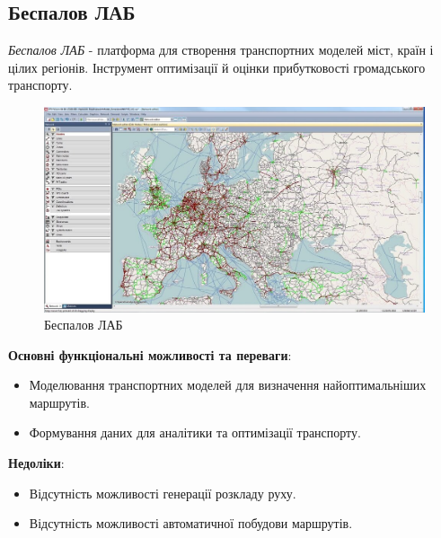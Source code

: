 \documentclass[14pt]{extreport}
\begin{document}
\begin{normalsize}
	\subsection*{Беспалов ЛАБ}
	\textit{Беспалов ЛАБ} - платформа для створення транспортних моделей міст, країн і цілих регіонів. Інструмент оптимізації й оцінки прибутковості громадського транспорту.
	
	\begin{figure}[H]
		\centering
		\includegraphics[scale=0.45]{2}
		\caption{Беспалов ЛАБ}
	\end{figure}
	
	\textbf{Основні функціональні можливості та переваги}:
	\begin{itemize}
		\item Моделювання транспортних моделей для визначення найоптимальніших маршрутів.
		\item Формування даних для аналітики та оптимізації транспорту.
	\end{itemize}
	
	\textbf{Недоліки}:
	\begin{itemize}
		\item Відсутність можливості генерації розкладу руху.
		\item Відсутність можливості автоматичної побудови маршрутів.
	\end{itemize}
	

\end{normalsize}
\end{document}
